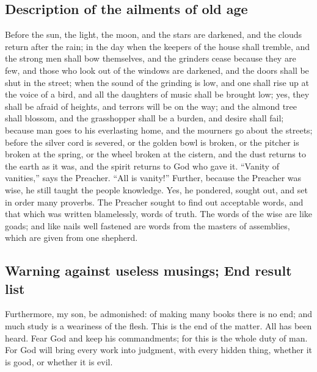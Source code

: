 \hypertarget{description-of-the-ailments-of-old-age}{%
\subsection{Description of the ailments of old
age}\label{description-of-the-ailments-of-old-age}}

 Before the sun, the light, the moon, and the stars are
darkened, and the clouds return after the rain;  in the
day when the keepers of the house shall tremble, and the strong men
shall bow themselves, and the grinders cease because they are few, and
those who look out of the windows are darkened,  and the
doors shall be shut in the street; when the sound of the grinding is
low, and one shall rise up at the voice of a bird, and all the daughters
of music shall be brought low;  yes, they shall be afraid
of heights, and terrors will be on the way; and the almond tree shall
blossom, and the grasshopper shall be a burden, and desire shall fail;
because man goes to his everlasting home, and the mourners go about the
streets;  before the silver cord is severed, or the golden
bowl is broken, or the pitcher is broken at the spring, or the wheel
broken at the cistern,  and the dust returns to the earth
as it was, and the spirit returns to God who gave it. 
``Vanity of vanities,'' says the Preacher. ``All is vanity!''
 Further, because the Preacher was wise, he still taught
the people knowledge. Yes, he pondered, sought out, and set in order
many proverbs.  The Preacher sought to find out
acceptable words, and that which was written blamelessly, words of
truth.  The words of the wise are like goads; and like
nails well fastened are words from the masters of assemblies, which are
given from one shepherd.

\hypertarget{warning-against-useless-musings-end-result-list}{%
\subsection{Warning against useless musings; End result
list}\label{warning-against-useless-musings-end-result-list}}

 Furthermore, my son, be admonished: of making many books
there is no end; and much study is a weariness of the flesh.
 This is the end of the matter. All has been heard. Fear
God and keep his commandments; for this is the whole duty of man.
 For God will bring every work into judgment, with every
hidden thing, whether it is good, or whether it is evil.
